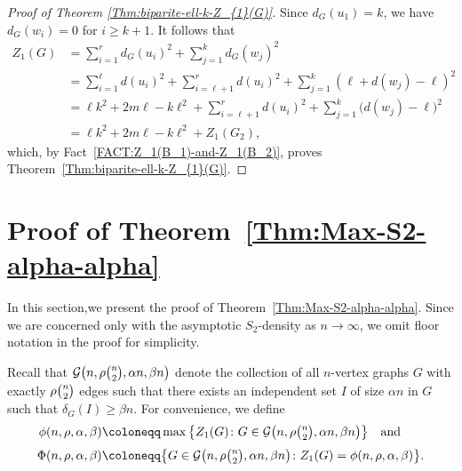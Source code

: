 \documentclass[11pt,a4paper]{article}
\begin{document}
\begin{proof}[Proof of Theorem \ref{Thm:biparite-ell-k-Z_{1}(G)}]
    Since $d_{G}(u_1) =k$, we have $d_{G}(w_i) = 0$ for $i \ge k+1$. 
    It follows that 
    \begin{align*}
        Z_{1}(G) 
        &= \sum_{i=1}^{r} d_{G}(u_i)^2 + \sum_{j=1}^{k} d_{G}(w_j)^2 \\
        &= \sum_{i=1}^{\ell } d(u_i)^2 + \sum_{i=\ell +1}^{r} d(u_i)^2 + \sum_{j=1}^{k}(\ell +d(w_j)-\ell )^2 \\
        & = \ell  k^2+ 2m\ell - k \ell^2  + \sum_{i=\ell +1}^{r} d(u_i)^2 + \sum_{j=1}^{k} \big( d(w_j)-\ell \big)^2 \\
        & = \ell  k^2+ 2m\ell - k \ell^2 + Z_{1}(G_2),  
    \end{align*}
    which, by Fact~\ref{FACT:Z_1(B_1)-and-Z_1(B_2)}, proves Theorem~\ref{Thm:biparite-ell-k-Z_{1}(G)}. 
\end{proof}

\section{Proof of Theorem~\ref{Thm:Max-S2-alpha-alpha}}\label{Sec:note-general-graph-alpha-alpha}

In this section,we present the proof of Theorem~\ref{Thm:Max-S2-alpha-alpha}. 
Since we are concerned only with the asymptotic $S_2$-density as $n \to \infty$, we omit floor notation in the proof for simplicity. 

Recall that $\mathcal{G}\big(n,\rho \tbinom{n}{2}, \alpha n, \beta n \big)$ denote the collection of all $n$-vertex graphs $G$ with exactly $\rho \tbinom{n}{2}$ edges such that there exists an independent set $I$ of size $\alpha n$ in $G$ such that $\delta_{G}(I) \ge \beta n$. 
For convenience, we define 
\begin{align*}
    \phi(n, \rho, \alpha, \beta)
    & \coloneqq \max\big\{ Z_{1}(G) \colon G \in \mathcal{G}\big(n,\rho \tbinom{n}{2}, \alpha n, \beta n \big) \big\}  \quad\text{and}\quad \\[0.3em]
    \Phi(n, \rho, \alpha, \beta)
    & \coloneqq \big\{ G \in \mathcal{G}\big(n,\rho \tbinom{n}{2}, \alpha n, \beta n \big) \colon Z_{1}(G) = \phi(n, \rho, \alpha, \beta) \big\}. 
\end{align*}
\end{document}
